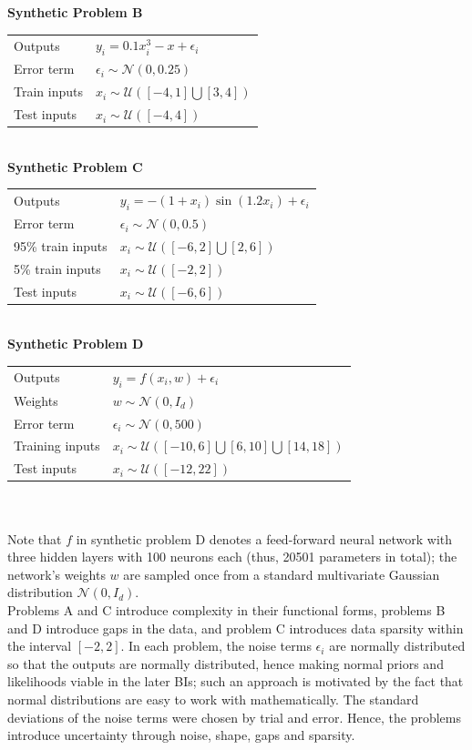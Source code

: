 \documentclass[conference]{IEEEtran}
\begin{document}
\textbf{Synthetic Problem B}

\begin{tabular}{m{2.5cm} | m{6cm}}
    Outputs & $y_i = 0.1x_i^3 - x + \epsilon_i$\\
    Error term & $\epsilon_i \sim \mathcal{N}(0, 0.25)$\\
    Train inputs & $x_i \sim \mathcal{U}([-4, 1] \bigcup [3, 4])$\\
    Test inputs & $x_i \sim \mathcal{U}([-4, 4])$
\end{tabular}\\

\textbf{Synthetic Problem C}

\begin{tabular}{m{2.5cm} | m{6cm}}
    Outputs & $y_i = -(1 + x_i)\sin(1.2x_i) + \epsilon_i$\\
    Error term & $\epsilon_i \sim \mathcal{N}(0, 0.5)$\\
    95\% train inputs & $x_i \sim \mathcal{U}([-6, 2] \bigcup [2, 6])$\\
    5\% train inputs & $x_i \sim \mathcal{U}([-2, 2])$\\
    Test inputs & $x_i \sim \mathcal{U}([-6, 6])$
\end{tabular}\\

\textbf{Synthetic Problem D}

\begin{tabular}{m{2.5cm} | m{6cm}}
    Outputs & $y_i = f(x_i, w) + \epsilon_i$\\
    Weights & $w \sim \mathcal{N}(0, I_d)$\\
    Error term & $\epsilon_i \sim \mathcal{N}(0, 500)$\\
    Training inputs & $x_i \sim \mathcal{U}([-10, 6] \bigcup [6, 10] \bigcup [14, 18])$\\
    Test inputs & $x_i \sim \mathcal{U}([-12, 22])$
\end{tabular}\\~\\

Note that $f$ in synthetic problem D denotes a feed-forward neural network with three hidden layers with 100 neurons each (thus, 20501 parameters in total); the network's weights $w$ are sampled once from a standard multivariate Gaussian distribution $\mathcal{N}(0, I_d)$.\\

Problems A and C introduce complexity in their functional forms, problems B and D introduce gaps in the data, and problem C introduces data sparsity within the interval $[-2, 2]$. In each problem, the noise terms $\epsilon_i$ are normally distributed so that the outputs are normally distributed, hence making normal priors and likelihoods viable in the later BIs; such an approach is motivated by the fact that normal distributions are easy to work with mathematically. The standard deviations of the noise terms were chosen by trial and error. Hence, the problems introduce uncertainty through noise, shape, gaps and sparsity.\\
\end{document}
